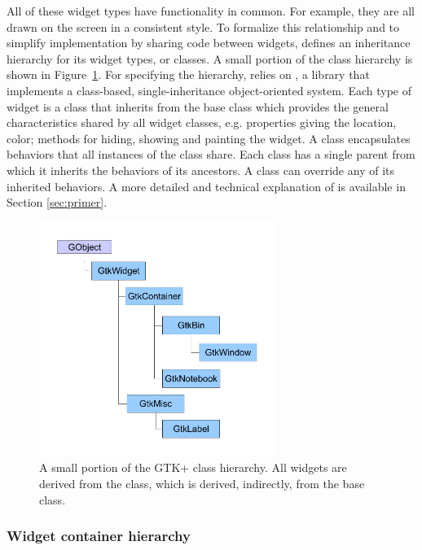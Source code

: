 \documentclass[article,shortnames]{jss}
\begin{document}
All of these widget types have functionality in common. For example,
they are all drawn on the screen in a consistent style. To formalize
this relationship and to simplify implementation by sharing code
between widgets,  defines an inheritance hierarchy for its
widget types, or classes. A small portion of the  class
hierarchy is shown in Figure~\ref{fig:class-hierarchy}. For specifying
the hierarchy,  relies on , a 
library that implements a class-based, single-inheritance
object-oriented system.  Each type of  widget is a
 class that inherits from the base  class
which provides the general characteristics shared by all widget
classes, e.g. properties giving the location, color; methods for
hiding, showing and painting the widget. A  class
encapsulates behaviors that all instances of the class share.  Each
class has a single parent from which it inherits the behaviors of its
ancestors. A class can override any of its inherited behaviors.  A
more detailed and technical explanation of  is available
in Section \ref{sec:primer}.

\begin{figure}[h!tbp]
\begin{center}
\includegraphics[width=3in]{class-hierarchy.pdf}
\caption{\label{fig:class-hierarchy}A small portion of the GTK+ class
hierarchy. 
All widgets are derived from the  class, which is
derived, 
indirectly, from the  base class.}
\end{center}
\end{figure}

\subsubsection{Widget container hierarchy}
\end{document}
